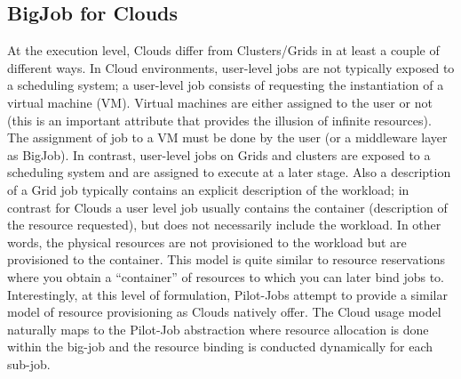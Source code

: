\documentclass[conference,final]{IEEEtran}
\newcommand{\up}{\vspace*{-1em}}
\newcommand{\jhanote}[1]{ {\textcolor{red} { ***SJ: #1 }}}
\newcommand{\jhanote}[1]{}
\begin{document}




\subsection{BigJob for Clouds}
\up


At the execution level, Clouds differ from Clusters/Grids in at least
a couple of different ways. In Cloud environments, user-level jobs are
not typically exposed to a scheduling system; a user-level job
consists of requesting the instantiation of a virtual machine (VM).
Virtual machines are either assigned to the user or not (this is an
important attribute that provides the illusion of infinite resources).
The assignment of job to a VM must be done by the user (or a
middleware layer as BigJob).  In contrast, user-level jobs on Grids
and clusters are exposed to a scheduling system and are assigned to
execute at a later stage.  Also a description of a Grid job
typically contains an explicit description of the workload; in contrast
for Clouds a user level job usually contains the container
(description of the resource requested), but does not necessarily
include the workload. In other words, the physical resources are not
provisioned to the workload but are provisioned to the container.
This model is quite similar to resource reservations where you obtain
a ``container'' of resources to which you can later bind jobs
to. Interestingly, at this level of formulation, Pilot-Jobs attempt to
provide a similar model of resource provisioning as Clouds natively
offer. The Cloud usage model naturally maps to the Pilot-Job abstraction 
where resource allocation is done within the big-job and the resource 
binding is conducted dynamically for each sub-job.
\end{document}
